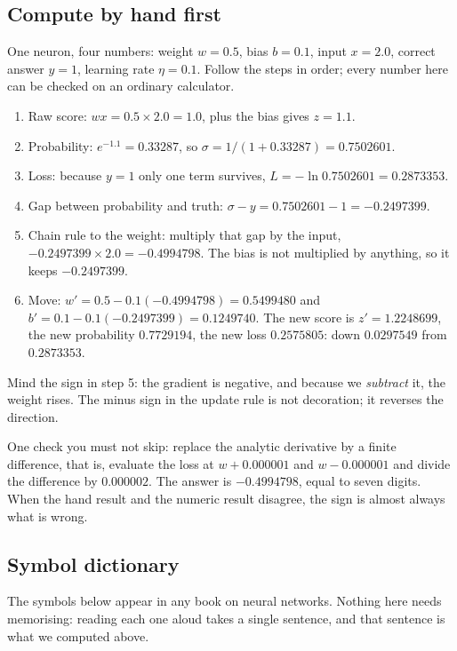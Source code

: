 \subsection{Compute by hand first}

\begin{contoh}
One neuron, four numbers: weight $w = 0.5$, bias $b = 0.1$, input $x = 2.0$, correct
answer $y = 1$, learning rate $\eta = 0.1$. Follow the steps in order; every number here
can be checked on an ordinary calculator.

\begin{enumerate}
  \item Raw score: $w x = 0.5 \times 2.0 = 1.0$, plus the bias gives $z = 1.1$.
  \item Probability: $e^{-1.1} = 0.33287$, so $\sigma = 1/(1+0.33287) = 0.7502601$.
  \item Loss: because $y = 1$ only one term survives, $L = -\ln 0.7502601 = 0.2873353$.
  \item Gap between probability and truth: $\sigma - y = 0.7502601 - 1 = -0.2497399$.
  \item Chain rule to the weight: multiply that gap by the input, $-0.2497399 \times 2.0
        = -0.4994798$. The bias is not multiplied by anything, so it keeps $-0.2497399$.
  \item Move: $w' = 0.5 - 0.1(-0.4994798) = 0.5499480$ and $b' = 0.1 - 0.1(-0.2497399)
        = 0.1249740$. The new score is $z' = 1.2248699$, the new probability $0.7729194$,
        the new loss $0.2575805$: down $0.0297549$ from $0.2873353$.
\end{enumerate}

Mind the sign in step 5: the gradient is negative, and because we \emph{subtract} it, the
weight rises. The minus sign in the update rule is not decoration; it reverses the
direction.
\end{contoh}

One check you must not skip: replace the analytic derivative by a finite difference, that
is, evaluate the loss at $w + 0.000001$ and $w - 0.000001$ and divide the difference by
$0.000002$. The answer is $-0.4994798$, equal to seven digits. When the hand result and the
numeric result disagree, the sign is almost always what is wrong.

\subsection{Symbol dictionary}

The symbols below appear in any book on neural networks. Nothing here needs memorising:
reading each one aloud takes a single sentence, and that sentence is what we computed above.

